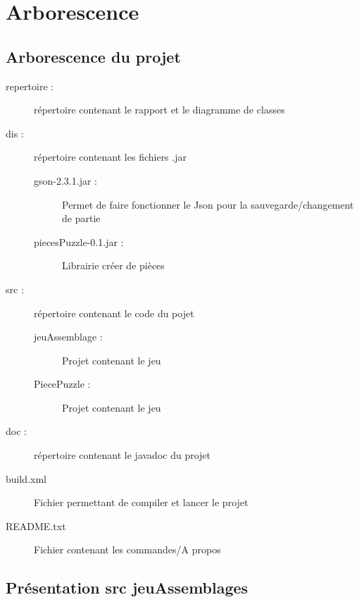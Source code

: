 \chapter{Arborescence}

	\section{Arborescence du projet}

		\begin{description}
            \item[repertoire :]{répertoire contenant le rapport et le diagramme de classes}
            \item[dis :]{répertoire contenant les fichiers .jar}
            \begin{description}
                \item[gson-2.3.1.jar :]{Permet de faire fonctionner le Json pour la sauvegarde/changement de partie}
                \item[piecesPuzzle-0.1.jar :]{Librairie créer de pièces}
            \end{description}
            \item[src :]{répertoire contenant le code du pojet}
            \begin{description}
                \item[jeuAssemblage :]{Projet contenant le jeu}
                \item[PiecePuzzle :]{Projet contenant le jeu}
            \end{description}
            \item[doc :]{répertoire contenant le javadoc du projet}
            \item[build.xml]{Fichier permettant de compiler et lancer le projet}
            \item[README.txt]{Fichier contenant les commandes/A propos}
		\end{description}

    \section{Présentation src jeuAssemblages}

